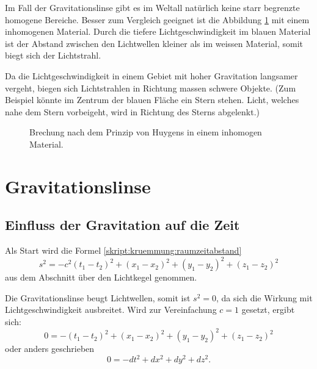 \begin{refsection}
Im Fall der Gravitationslinse gibt es im Weltall natürlich keine starr
begrenzte homogene Bereiche.  Besser zum Vergleich geeignet ist die
Abbildung \ref{fig:huygens3} mit einem inhomogenen Material.  Durch
die tiefere Lichtgeschwindigkeit im blauen Material ist der Abstand
zwischen den Lichtwellen kleiner als im weissen Material, somit biegt
sich der Lichtstrahl.

Da die Lichtgeschwindigkeit in einem Gebiet mit hoher Gravitation
langsamer vergeht, biegen sich Lichtstrahlen in Richtung massen
schwere Objekte.  (Zum Beispiel könnte im Zentrum der blauen Fläche
ein Stern stehen.  Licht, welches nahe dem Stern vorbeigeht, wird in
Richtung des Sterns abgelenkt.)

\begin{figure}
  \centering
  
  \caption{Brechung nach dem Prinzip von Huygens in einem inhomogen
    Material.}
  \label{fig:huygens3}
\end{figure}


\section{Gravitationslinse}
\subsection{Einfluss der Gravitation auf die Zeit}
Als Start wird die Formel \eqref{skript:kruemmung:raumzeitabstand}
\begin{equation*}
  s^2 = -c^2 (t_1-t_2)^2 + (x_1-x_2)^2 + (y_1-y_2)^2 + (z_1-z_2)^2
\end{equation*}
aus dem Abschnitt über den Lichtkegel genommen.

Die Gravitationslinse beugt Lichtwellen, somit ist \(s^2=0\), da sich
die Wirkung mit Lichtgeschwindigkeit ausbreitet.  Wird zur
Vereinfachung \(c=1\) gesetzt, ergibt sich:
\begin{equation*}
  0 = -(t_1-t_2)^2 + (x_1-x_2)^2 + (y_1-y_2)^2 + (z_1-z_2)^2
\end{equation*}
oder anders geschrieben
\begin{equation*}
  0 = -dt^2 + dx^2 + dy^2 + dz^2.
\end{equation*}


\end{refsection}
